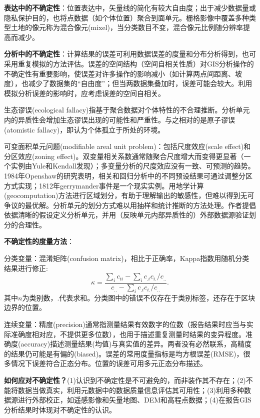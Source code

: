 \par \textbf{表达中的不确定性}：位置表达中，矢量线的简化有较大自由度；出于减少数据量或隐私保护目的，也将点数据（如个体位置）聚合到面单元。栅格影像中覆盖多种类型土地的像元称为混合像元(mixel)，当分类数目不变，混合像元比例随分辨率提高而减少。

\par \textbf{分析中的不确定性}：计算结果的误差可利用数据误差的度量和分布分析得到，也可采用重复模拟的方法评估。误差的空间结构（空间自相关性质）对GIS分析操作的不确定性有重要影响，使误差对许多操作的影响减小（如计算两点间距离、坡度），也减少了数据集的``自由度''；但当两数据集叠加时，误差可能会较大。利用模拟分析误差的影响时，应考虑误差的空间自相关。
\par 生态谬误(ecological fallacy)指基于聚合数据对个体特性的不合理推断。分析单元内的异质性会增加生态谬误出现的可能性和严重性。与之相对的是原子谬误(atomistic fallacy)，即认为个体孤立于所处的环境。
\par 可变面积单元问题(modifiable areal unit problem)：包括尺度效应(scale effect)和分区效应(zoning effect)。双变量相关系数通常随聚合尺度增大而变得更显著（一个实例由Yule和Kendall发现）；多变量分析的尺度效应没有一致、可预测的趋势。1984年Openshaw的研究表明，相关和回归分析中的不同预设结果可通过调整分区方式实现；1812年gerrymander事件是一个现实实例。用地学计算(geocomputation)方法进行区域划分，有助于理解输出的敏感性，但难以得到无可争议的最优解。分析单元的划分方式难以用抽样和统计推断的方法处理。作者提倡依据清晰的假设定义分析单元，并用（反映单元内部异质性的）外部数据源验证划分的合理性。

\par \textbf{不确定性的度量方法}：
\par 分类变量：混淆矩阵(confusion matrix)，相比于正确率，Kappa指数用随机分类结果进行修正:
\begin{displaymath}
\kappa = \frac{\sum_i c_{ii}-\sum_i c_{.i}c_{i .}/c_{..}}{c_{..}-\sum_i c_{. i}c_{i .}/c_{..}}.
\end{displaymath}
其中$n$为类别数，.代表求和。分类图中的错误不仅存在于类别标签，还存在于区块边界的位置。
\par 连续变量：精度(precision)通常指测量结果有效数字的位数（报告结果时应当与实际准确度相对应，不提供更多位数），也用于描述重复测量时结果的变异程度。准确度(accuracy)描述测量结果(均值)与真实值的差异。两者没有必然联系，高精度的结果仍可能是有偏的(biased)。误差的常用度量指标是均方根误差(RMSE)，很多情况下误差符合正态分布。位置的误差可用多元正态分布描述。

\par \textbf{如何应对不确定性？}(1)认识到不确定性是不可避免的，而非装作其不存在；(2)不能将数据当做真实，利用元数据中的数据质量信息评估其可用性；(3)利用多种数据源进行外部校正，如遥感影像和矢量地图、DEM和高程点数据；(4)在报告GIS分析结果时体现对不确定性的认识。

